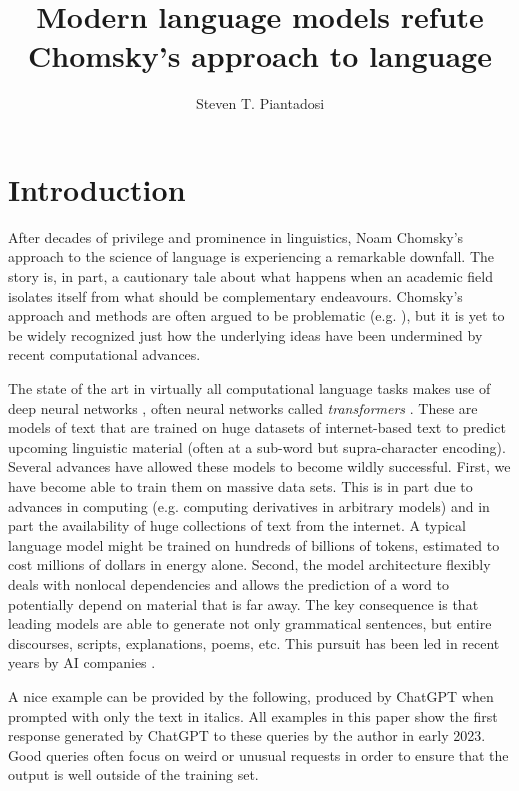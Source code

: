 \documentclass[output=paper,colorlinks,citecolor=brown]{langscibook}
\author{Steven T. Piantadosi\orcid{}\affiliation{UC Berkeley \& Helen Wills Neuroscience Institute} }
\title{Modern language models refute Chomsky's approach to language}
\begin{document}
\maketitle
\label{chap-16_piantadosi}

\section{Introduction}\largerpage

After decades of privilege and prominence in linguistics, Noam Chomsky's approach to the science of language is experiencing a remarkable downfall. The  story is, in part, a cautionary tale about what happens when an academic field isolates itself from what should be complementary endeavours. Chomsky's approach and methods are often argued to be problematic (e.g. \citealt{harris1993linguistics,pullum1989formal,behme2012potpourri,postal2012two,behme2014galilean}), but it is yet to be widely recognized just how the underlying ideas have been undermined by recent computational advances.

The state of the art in virtually all computational language tasks makes use of deep neural networks \citep{lecun2015deep}, often neural networks called \textit{transformers} \citep{vaswani2017attention,brown2020language,bommasani2021opportunities}. These are models of text that are trained on huge datasets of internet-based text to predict upcoming linguistic material (often at a sub-word but supra-character encoding). Several advances have allowed these models to become wildly successful. First, we have become able to train them on massive data sets. This is in part due to advances in computing (e.g. computing derivatives in arbitrary models) and in part the availability of huge collections of text from the internet. A typical language model might be trained on hundreds of billions of tokens, estimated to cost millions of dollars in energy alone. Second, the model architecture flexibly deals with nonlocal dependencies and allows the prediction of a word to potentially depend on material that is far away. The key consequence is that leading models are able to generate not only grammatical sentences, but entire discourses, scripts, explanations, poems, etc. This pursuit has been led in recent years by AI companies \citep{ahmed2023growing}.

A nice example can be provided by the following, produced by ChatGPT when prompted with only the text in italics. All examples in this paper show the first response generated by ChatGPT to these queries by the author in early 2023. Good queries often focus on weird or unusual requests in order to ensure that the output is well outside of the training set.
\end{document}
